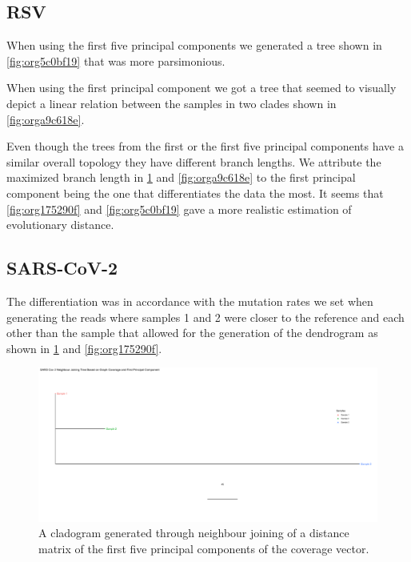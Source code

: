 \documentclass[10pt, a4paper]{article}
\begin{document}
\subsection{RSV}
\label{sec:org4ceece2}
When using the first five principal components we generated a tree shown in 
\ref{fig:org5c0bf19} that was more parsimonious.

When using the first principal component we got a tree that seemed to visually
depict a linear relation between the samples in two clades shown in
\ref{fig:orga9c618e}.

Even though the trees from the first or the first five principal components 
have a similar overall topology they have different branch lengths. 
We attribute the maximized branch length in \ref{fig:orgf894e9d} and 
\ref{fig:orga9c618e} to the
first principal component being the one that differentiates the data the most.
It seems that \ref{fig:org175290f} and \ref{fig:org5c0bf19} gave a more realistic
estimation of evolutionary distance.

\subsection{SARS-CoV-2}
\label{sec:org6974dc8}
The differentiation was in accordance with the mutation rates we set when 
generating the reads where samples 1 and 2 were closer to the reference and each
other than the sample that allowed for the generation of the dendrogram as shown 
in \ref{fig:orgf894e9d} and \ref{fig:org175290f}.

\begin{landscape}
\begin{figure}
\centering
\includegraphics[width=.9\linewidth]{../Figures/SARS_CoV_2/SARS_CoV_2_first_principal_component_nj_tree.png}
\caption[SARS-CoV-2 PC1 cladogram]{\label{fig:orgf894e9d}
A cladogram generated through neighbour joining  of a distance matrix of the first five  principal components of the coverage vector.}
\end{figure}
\end{landscape}
\end{document}
